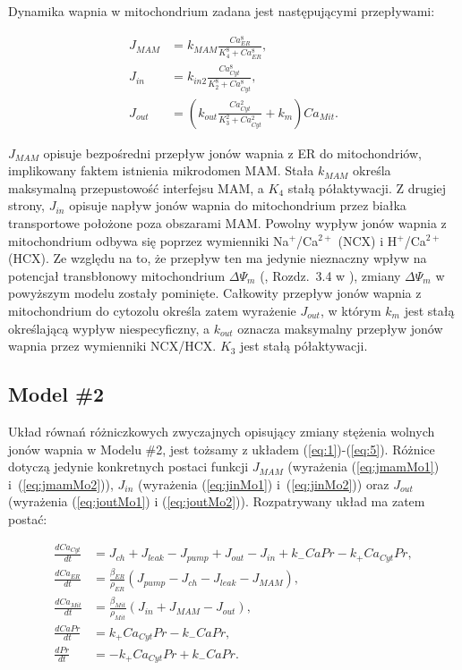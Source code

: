 Dynamika wapnia w mitochondrium zadana jest następującymi przepływami:

\begin{align}
J_{MAM}&= k_{MAM} \frac{Ca_{ER}^8}{K_4^8 + Ca_{ER}^8},\label{eq:jmamMo1}\\
J_{in}&= k_{in2}\frac{Ca_{Cyt}^8}{K_2^8+Ca_{Cyt}^8},\label{eq:jinMo1}\\
J_{out}&= \left(k_{out}\frac{Ca_{Cyt}^2}{K_3^2+Ca_{Cyt}^2}+k_m\right)
Ca_{Mit}.\label{eq:joutMo1}
\end{align}

$J_{MAM}$ opisuje bezpośredni przepływ jonów wapnia z ER do mitochondriów, implikowany faktem istnienia mikrodomen MAM. Stała $k_{MAM}$ określa maksymalną przepustowość interfejsu MAM, a $K_4$ stałą półaktywacji. Z drugiej strony, $J_{in}$ opisuje napływ jonów wapnia do mitochondrium przez białka transportowe położone poza obszarami MAM. Powolny wypływ jonów wapnia z mitochondrium odbywa się poprzez wymienniki \mbox{Na$^+$/Ca$^{2+}$} (NCX) i \mbox{H$^+$/Ca$^{2+}$} (HCX). Ze względu na to, że przepływ ten ma jedynie nieznaczny wpływ na potencjał transbłonowy mitochondrium $\Delta \Psi_m$ (\cite{Babcock1997}, Rozdz.~3.4 w \cite{Falcke2004}), zmiany $\Delta \Psi_m$ w powyższym modelu zostały pominięte. Całkowity przepływ jonów wapnia z mitochondrium do cytozolu określa zatem wyrażenie $J_{out}$, w którym $k_m$ jest stałą określającą wypływ niespecyficzny, a $k_{out}$ oznacza maksymalny przepływ jonów wapnia przez wymienniki NCX/HCX. $K_3$
jest stałą półaktywacji.

\FloatBarrier
\subsection{Model \#2}
Układ równań różniczkowych zwyczajnych opisujący zmiany stężenia wolnych jonów wapnia w Modelu \#2, jest tożsamy z układem (\ref{eq:1})-(\ref{eq:5}). Różnice dotyczą jedynie konkretnych postaci funkcji $J_{MAM}$ (wyrażenia (\ref{eq:jmamMo1}) i~(\ref{eq:jmamMo2})), $J_{in}$ (wyrażenia (\ref{eq:jinMo1}) i~(\ref{eq:jinMo2})) oraz $J_{out}$ (wyrażenia (\ref{eq:joutMo1}) i (\ref{eq:joutMo2})). Rozpatrywany układ ma zatem postać:

\begin{align}
\frac{dCa_{Cyt}}{dt}&=J_{ch}+J_{leak}-J_{pump}+J_{out}-J_{in} \label{eq:1aa} 
			+k_-CaPr-k_+Ca_{Cyt}Pr, \\
\frac{dCa_{ER}}{dt}&=\frac{\beta_{ER}}{\rho_{ER}}\left(J_{pump}-J_{ch}
			-J_{leak} -J_{MAM}\right), \label{eq:2aa}\\
\frac{dCa_{Mit}}{dt}&=\frac{\beta_{Mit}}{\rho_{Mit}}\left(J_{in}+J_{MAM}
			-J_{out}\right), \label{eq:3aa}\\
\frac{dCaPr}{dt}&= k_+ Ca_{Cyt}Pr - k_-CaPr, \label{eq:4aa}\\
\frac{dPr}{dt}&= -k_+ Ca_{Cyt}Pr + k_-CaPr. \label{eq:5aa}
\end{align} 



